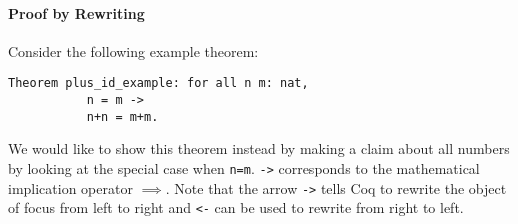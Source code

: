 	     \paragraph{Proof by Rewriting} 
	     \label{par:ProofByRewriting}
	     
	     Consider the following example theorem:     
		 \begin{lstlisting}[caption=\lstinline!plus_id_examples!]
		 Theorem plus_id_example: for all n m: nat,
	       n = m -> 
		   n+n = m+m.	 
		 \end{lstlisting}
		 We would like to show this theorem instead by making a claim about all numbers by looking at the special case when \lstinline!n=m!.
	     \lstinline!->! corresponds to the mathematical implication operator $\implies$. 
	     Note that the arrow \lstinline!->! tells Coq to rewrite the object of focus from left to right and \lstinline!<-! can be used to rewrite from right to left.\\
	     

